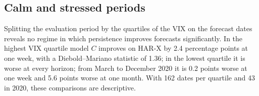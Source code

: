 \subsection{Calm and stressed periods}

Splitting the evaluation period by the quartiles of the VIX on the forecast
dates reveals no regime in which persistence improves forecasts
significantly. In the highest VIX quartile model $C$ improves on HAR-X by 2.4
percentage points at one week, with a Diebold--Mariano statistic of 1.36; in
the lowest quartile it is worse at every horizon; from March to December 2020
it is 0.2 points worse at one week and 5.6 points worse at one month. With
162 dates per quartile and 43 in 2020, these comparisons are descriptive.
